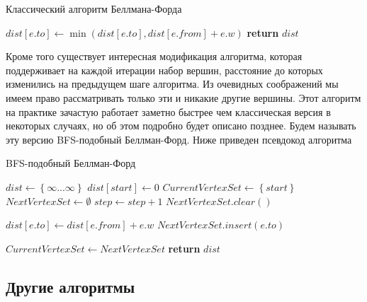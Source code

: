 \FloatBarrier
\begin{algorithm}
\caption{Классический алгоритм Беллмана-Форда}\label{bf_classic_seq}
\begin{algorithmic}[1]
 
		\State $dist[e.to] \gets \min(dist[e.to], dist[e.from] + e.w)$
	\EndFor
\EndFor
\State \textbf{return} $dist$
\EndProcedure
\end{algorithmic}
\end{algorithm}

\FloatBarrier
Кроме того существует интересная модификация алгоритма, которая поддерживает на каждой итерации набор вершин, расстояние до которых изменились на предыдущем шаге алгоритма. Из очевидных соображений мы имеем право рассматривать только эти и никакие другие вершины. Этот алгоритм на практике зачастую работает заметно быстрее чем классическая версия в некоторых случаях, но об этом подробно будет описано позднее. Будем называть эту версию BFS-подобный Беллман-Форд. Ниже приведен псевдокод алгоритма 

\FloatBarrier
\begin{algorithm}
\caption{BFS-подобный Беллман-Форд}\label{bf_bfs_seq}
\begin{algorithmic}[1]
\State $dist\gets \left\{ {\infty ... \infty}\right\}$
\State $dist[start] \gets 0$
\State $CurrentVertexSet \gets \left\{ {start}\right\}$ 
\State $NextVertexSet \gets \emptyset$ 
	\State $step \gets step + 1$
	\State $NextVertexSet.clear()$
	
		  
				\State $dist[e.to] \gets dist[e.from] + e.w$
				\State $NextVertexSet.insert(e.to)$								
			\EndIf
		\EndFor
	\EndFor
	
	\State $CurrentVertexSet \gets NextVertexSet$	
\EndWhile
\State \textbf{return} $dist$

\EndProcedure
\end{algorithmic}
\end{algorithm}

\FloatBarrier
\subsection{Другие алгоритмы}

